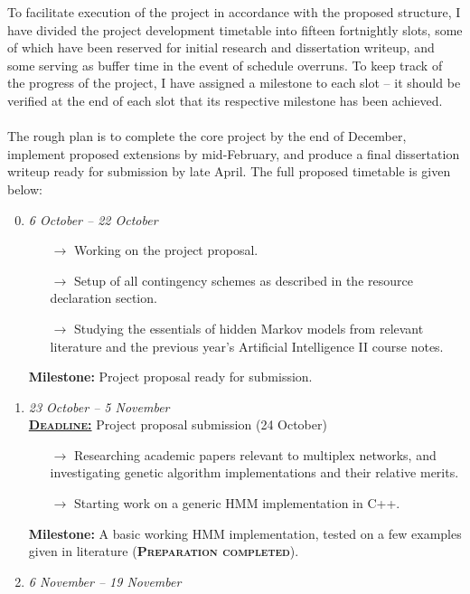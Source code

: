 To facilitate execution of the project in accordance with the proposed structure, I have divided the project development timetable into fifteen fortnightly slots, some of which have been reserved for initial research and dissertation writeup, and some serving as buffer time in the event of schedule overruns. To keep track of the progress of the project, I have assigned a milestone to each slot -- it should be verified at the end of each slot that its respective milestone has been achieved. \\ \\
The rough plan is to complete the core project by the end of December, implement proposed extensions by mid-February, and produce a final dissertation writeup ready for submission by late April. The full proposed timetable is given below:

\begin{enumerate}[label=\bf Slot \arabic*:]
    \setcounter{enumi}{-1}
    \item \emph{6 October -- 22 October}
        \begin{itemize}
            \item[$\rightarrow$] Working on the project proposal.
            \item[$\rightarrow$] Setup of all contingency schemes as described in the resource declaration section.
            \item[$\rightarrow$] Studying the essentials of hidden Markov models from relevant literature and the previous year's Artificial Intelligence II course notes.
        \end{itemize}
        \textbf{Milestone:} Project proposal ready for submission.
    \item \emph{23 October -- 5 November}\\
        \underline{\textbf{\textsc{Deadline:}}} Project proposal submission (24 October)
        \begin{itemize}
            \item[$\rightarrow$] Researching academic papers relevant to multiplex networks, and investigating genetic algorithm implementations and their relative merits.
            \item[$\rightarrow$] Starting work on a generic HMM implementation in C++.
        \end{itemize}
        \textbf{Milestone:} A basic working HMM implementation, tested on a few examples given in literature (\textbf{\textsc{Preparation completed}}).
    \item \emph{6 November -- 19 November}

\end{enumerate}

